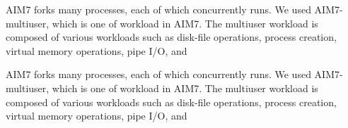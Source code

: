 \fi




\ifkor
AIM7 forks many processes, each of which concurrently runs. 
We used AIM7-multiuser, which is one of workload in AIM7.
The multiuser workload is composed of various workloads such as disk-file
operations, process creation, virtual memory operations, pipe I/O, and
\else

\fi



\ifkor
AIM7 forks many processes, each of which concurrently runs. 
We used AIM7-multiuser, which is one of workload in AIM7.
The multiuser workload is composed of various workloads such as disk-file
operations, process creation, virtual memory operations, pipe I/O, and
\else

\fi
